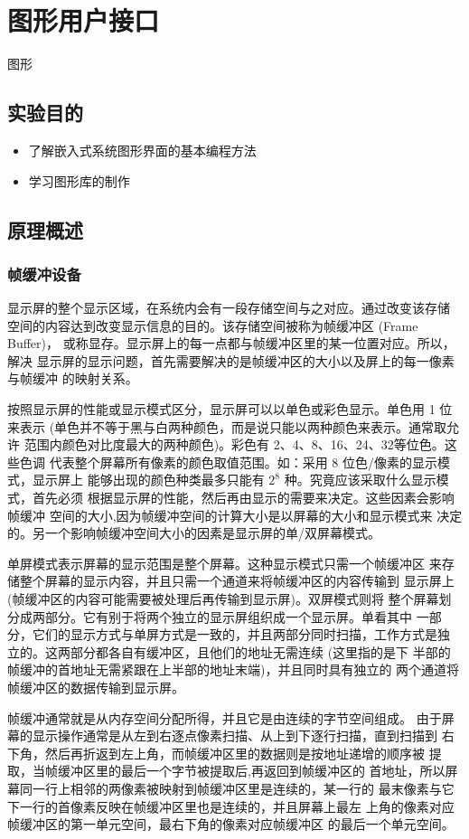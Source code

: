 \chapter{图形用户接口}{图形}

\section{实验目的}
\begin{itemize}
  \item 了解嵌入式系统图形界面的基本编程方法
  \item 学习图形库的制作
\end{itemize}

\section{原理概述}
\subsection{帧缓冲设备}
显示屏的整个显示区域，在系统内会有一段存储空间与之对应。通过改变该存储
空间的内容达到改变显示信息的目的。该存储空间被称为帧缓冲区 (Frame Buffer)，
或称显存。显示屏上的每一点都与帧缓冲区里的某一位置对应。所以，解决
显示屏的显示问题，首先需要解决的是帧缓冲区的大小以及屏上的每一像素与帧缓冲
的映射关系。

按照显示屏的性能或显示模式区分，显示屏可以以单色或彩色显示。单色用 1 位
来表示 (单色并不等于黑与白两种颜色，而是说只能以两种颜色来表示。通常取允许
范围内颜色对比度最大的两种颜色)。彩色有 2、4、8、16、24、32等位色。这些色调
代表整个屏幕所有像素的颜色取值范围。如：采用 8 位色/像素的显示模式，显示屏上
能够出现的颜色种类最多只能有 $2^8$ 种。究竟应该采取什么显示模式，首先必须
根据显示屏的性能，然后再由显示的需要来决定。这些因素会影响帧缓冲
空间的大小,因为帧缓冲空间的计算大小是以屏幕的大小和显示模式来
决定的。另一个影响帧缓冲空间大小的因素是显示屏的单/双屏幕模式。

单屏模式表示屏幕的显示范围是整个屏幕。这种显示模式只需一个帧缓冲区
来存储整个屏幕的显示内容，并且只需一个通道来将帧缓冲区的内容传输到
显示屏上 (帧缓冲区的内容可能需要被处理后再传输到显示屏)。双屏模式则将
整个屏幕划分成两部分。它有别于将两个独立的显示屏组织成一个显示屏。单看其中
一部分，它们的显示方式与单屏方式是一致的，并且两部分同时扫描，工作方式是独
立的。这两部分都各自有缓冲区，且他们的地址无需连续 (这里指的是下
半部的帧缓冲的首地址无需紧跟在上半部的地址末端)，并且同时具有独立的
两个通道将帧缓冲区的数据传输到显示屏。

帧缓冲通常就是从内存空间分配所得，并且它是由连续的字节空间组成。
由于屏幕的显示操作通常是从左到右逐点像素扫描、从上到下逐行扫描，直到扫描到
右下角，然后再折返到左上角，而帧缓冲区里的数据则是按地址递增的顺序被
提取，当帧缓冲区里的最后一个字节被提取后,再返回到帧缓冲区的
首地址，所以屏幕同一行上相邻的两像素被映射到帧缓冲区里是连续的，某一行的
最末像素与它下一行的首像素反映在帧缓冲区里也是连续的，并且屏幕上最左
上角的像素对应帧缓冲区的第一单元空间，最右下角的像素对应帧缓冲区
的最后一个单元空间。

